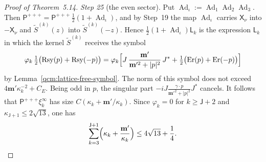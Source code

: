 \documentclass[11pt,letterpaper,reqno]{amsart}
\theoremstyle{definition}
\begin{document}
\begin{proof}[Proof of Theorem~5.14]
\emph{Step 25} (the even sector).
Put $\operatorname{Ad}_\iota:=\allowbreak \operatorname{Ad}_1\operatorname{Ad}_2\operatorname{Ad}_3$.
Then $\mathsf P^{+++}=\allowbreak \mathsf P^{+++}\,\allowbreak \frac12(1+\operatorname{Ad}_\iota)$, and by Step~19 the map $\operatorname{Ad}_\iota$ carries $\mathsf X_\nu$ into $-\mathsf X_\nu$ and $\tilde S^{(k)}(z)$ into $\tilde S^{(k)}(-z)$.
Hence $\frac12(1+\operatorname{Ad}_\iota)\mathsf L_k$ is the expression $\mathsf L_k$ in which the kernel $\tilde S^{(k)}$ receives the symbol
\begin{equation*}
\varphi_k\,\tfrac12\bigl(\mathrm{Rsy}(p)+\mathrm{Rsy}(-p)\bigr)=\varphi_k\Bigl[J\,\frac{\mathbf m'}{\mathbf m'^2+|p|^2}\,J^*+\tfrac12\bigl(\mathrm{Er}(p)+\mathrm{Er}(-p)\bigr)\Bigr]
\end{equation*}
by Lemma~\ref{qcm:lattice-free-symbol}. The norm of this symbol does not exceed $4\mathbf m'\kappa_k^{-2}+C_E$.
Being odd in $p$, the singular part $-iJ\frac{\gamma\cdot p}{\mathbf m'^2+|p|^2}J^*$ cancels.
It follows that $\mathsf P^{+++}\xi_k^\infty$ has size $C(\kappa_k+\mathbf m'/\kappa_k)$.
Since $\varphi_k=0$ for $k\ge\mathsf J+2$ and $\kappa_{\mathsf J+1}\le2\sqrt{13}$, one has
\begin{equation*}
\sum_{k=3}^{\mathsf J+1}\Bigl(\kappa_k+\frac{\mathbf m'}{\kappa_k}\Bigr)\le4\sqrt{13}+\frac14.
\end{equation*}


\end{proof}
\end{document}
